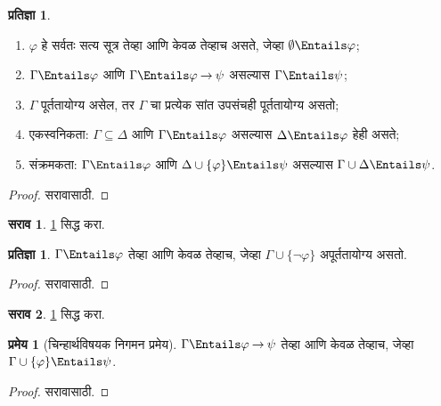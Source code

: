 \documentclass[11pt,a4paper,openany]{book}
\theoremstyle{definition}
\newtheorem{prop}[defn]{प्रतिज्ञा}
\newtheorem{thm}[defn]{प्रमेय}
\newtheorem{prob}{सराव}[chapter]
\newcommand{\lif}{\mathbin{\to}}
\begin{document}
\begin{prop}
\label{pl:syn:sem:prop:semanticalfacts}
\begin{enumerate}
\item $\varphi$ हे सर्वतः सत्य सूत्र तेव्हा आणि केवळ तेव्हाच असते, जेव्हा
  $\emptyset \Entails \varphi$;
\item $\Gamma \Entails \varphi$ आणि $\Gamma \Entails \varphi \lif \psi$ असल्यास
  $\Gamma \Entails \psi$;
\item $\Gamma$ पूर्ततायोग्य असेल, तर $\Gamma$ चा प्रत्येक सांत उपसंचही
  पूर्ततायोग्य असतो;
\item \label{pl:syn:sem:def:monotonicity} एकस्वनिकता: $\Gamma \subseteq \Delta$
  आणि $\Gamma \Entails \varphi$ असल्यास $\Delta \Entails \varphi$ हेही असते;
\item \label{pl:syn:sem:def:Cut} संक्रमकता: $\Gamma \Entails \varphi$ आणि
  $\Delta \cup \{ \varphi\} \Entails \psi$ असल्यास $\Gamma \cup \Delta \Entails
  \psi$.
\end{enumerate}
\end{prop}

\begin{proof}
सरावासाठी.
\end{proof}

\begin{prob}
\ref{pl:syn:sem:prop:semanticalfacts} सिद्ध करा.
\end{prob}

\begin{prop}\label{pl:syn:sem:prop:entails-unsat}
  $\Gamma \Entails \varphi$ तेव्हा आणि केवळ तेव्हाच, जेव्हा
  $\Gamma \cup \{\lnot \varphi\}$ अपूर्ततायोग्य असतो.
\end{prop}

\begin{proof}
सरावासाठी.
\end{proof}

\begin{prob}
\ref{pl:syn:sem:prop:entails-unsat} सिद्ध करा.
\end{prob}

\begin{thm}[चिन्हार्थविषयक निगमन प्रमेय]
  \label{pl:syn:sem:thm:sem-deduction} $\Gamma \Entails \varphi \lif \psi$ तेव्हा आणि केवळ
  तेव्हाच, जेव्हा $\Gamma \cup \{\varphi\} \Entails \psi$.
\end{thm}

\begin{proof}
सरावासाठी.
\end{proof}
\end{document}

